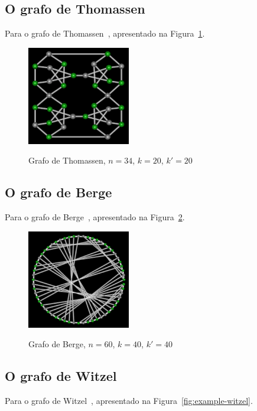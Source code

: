 \subsection{O grafo de Thomassen}
Para o grafo de Thomassen~\cite{cite:example-thomassen},
apresentado na Figura~\ref{fig:example-thomassen}.

\begin{figure}[htb]
\centering
\includegraphics[width=0.4\textwidth]{img/thomassen.png}
\label{fig:example-thomassen}
\caption{Grafo de Thomassen, $n=34$, $k=20$, $k'=20$}
\end{figure}


\subsection{O grafo de Berge}
Para o grafo de Berge~\cite{cite:example-berge},
apresentado na Figura~\ref{fig:example-berge}.

\begin{figure}[htb]
\centering
\includegraphics[width=0.4\textwidth]{img/berge.png}
\label{fig:example-berge}
\caption{Grafo de Berge, $n=60$, $k=40$, $k'=40$}
\end{figure}


\subsection{O grafo de Witzel}
Para o grafo de Witzel~\cite{cite:example-witzel},
apresentado na Figura~\ref{fig:example-witzel}.

